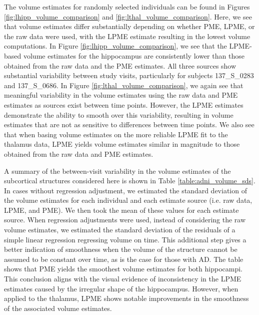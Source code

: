 \documentclass[11pt,reqno]{article}
\newcommand{\zielinski}[1]{{\color{blue} \sf $\spadesuit\spadesuit\spadesuit$ Rob Zielinski: [#1]}}
\theoremstyle{definition}
\begin{document}
The volume estimates for randomly selected individuals can be found in Figures \ref{fig:lhipp_volume_comparison} and \ref{fig:lthal_volume_comparison}. Here, we see that volume estimates differ substantially depending on whether PME, LPME, or the raw data were used, with the LPME estimate resulting in the lowest volume computations. In Figure \ref{fig:lhipp_volume_comparison}, we see that the LPME-based volume estimates for the hippocampus are consistently lower than those obtained from the raw data and the PME estimates. All three sources show substantial variability between study visits, particularly for subjects 137\_S\_0283 and 137\_S\_0686. In Figure \ref{fig:lthal_volume_comparison}, we again see that meaningful variability in the volume estimates using the raw data and PME estimates as sources exist between time points. However, the LPME estimates demonstrate the ability to smooth over this variability, resulting in volume estimates that are not as sensitive to differences between time points. We also see that when basing volume estimates on the more reliable LPME fit to the thalamus data, LPME yields volume estimates similar in magnitude to those obtained from the raw data and PME estimates.

A summary of the between-visit variability in the volume estimates of the subcortical structures considered here is shown in Table \ref{table:adni_volume_sds}. In cases without regression adjustment, we estimated the standard deviation of the volume estimates for each individual and each estimate source (i.e. raw data, LPME, and PME). We then took the mean of these values for each estimate source. When regression adjustments were used, instead of considering the raw volume estimates, we estimated the standard deviation of the residuals of a simple linear regression regressing volume on time. This additional step gives a better indication of smoothness when the volume of the structure cannot be assumed to be constant over time, as is the case for those with AD. The table shows that PME yields the smoothest volume estimates for both hippocampi. This conclusion aligns with the visual evidence of inconsistency in the LPME estimates caused by the irregular shape of the hippocampus. However, when applied to the thalamus, LPME shows notable improvements in the smoothness of the associated volume estimates.

\end{document}
